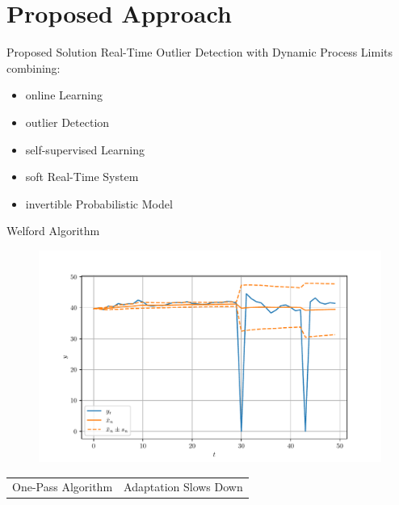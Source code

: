\documentclass[aspectratio=169]{beamer}
\begin{document}
\section{Proposed Approach}

\begin{frame}{Proposed Solution}
    Real-Time Outlier Detection with Dynamic Process Limits
    combining:
    \begin{itemize}
        \item online Learning
        \item outlier Detection
        \item self-supervised Learning
        \item soft Real-Time System
        \item invertible Probabilistic Model
    \end{itemize}
\end{frame}


\begin{frame}{Welford Algorithm}
    \begin{figure}
        \begin{center}
            \includegraphics[width=0.62\linewidth]{../ilustrate/pc2023/welford.pdf}
        \end{center}
    \end{figure}
    \begin{table}
        \centering
        \begin{tabular}{c|c}
            {\color{green}{$+$}} One-Pass Algorithm & {\color{red}{$-$}} Adaptation Slows Down \\
        \end{tabular}
    \end{table}
\end{frame}
\end{document}

